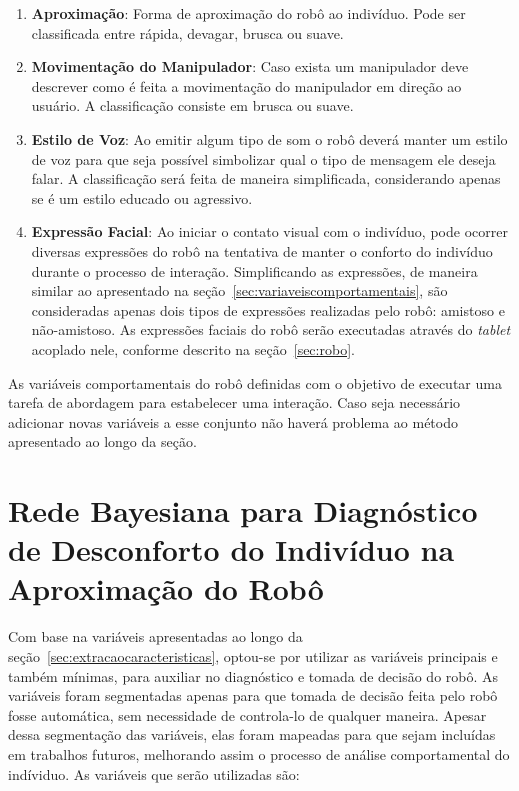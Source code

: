 \begin{enumerate}
	\item \textbf{Aproximação}: Forma de aproximação do robô ao indivíduo. Pode ser classificada entre rápida, devagar, brusca ou suave.
	\item \textbf{Movimentação do Manipulador}: Caso exista um manipulador deve descrever como é feita a movimentação do manipulador em direção ao usuário. A classificação consiste em brusca ou suave.
	\item \textbf{Estilo de Voz}: Ao emitir algum tipo de som o robô deverá manter um estilo de voz para que seja possível simbolizar qual o tipo de mensagem ele deseja falar. A classificação será feita de maneira simplificada, considerando apenas se é um estilo educado ou agressivo.
	\item \textbf{Expressão Facial}: Ao iniciar o contato visual com o indivíduo, pode ocorrer diversas expressões do robô na tentativa de manter o conforto do indivíduo durante o processo de interação. Simplificando as expressões, de maneira similar ao apresentado na seção~\ref{sec:variaveiscomportamentais}, são consideradas apenas dois tipos de expressões realizadas pelo robô: amistoso e não-amistoso. As expressões faciais do robô serão executadas através do \emph{tablet} acoplado nele, conforme descrito na seção~\ref{sec:robo}.
\end{enumerate}

As variáveis comportamentais do robô definidas com o objetivo de executar uma tarefa de abordagem para estabelecer uma interação. Caso seja necessário adicionar novas variáveis a esse conjunto não haverá problema ao método apresentado ao longo da seção.

\section{Rede Bayesiana para Diagnóstico de Desconforto do Indivíduo na Aproximação do Robô}
\label{sec:rede-bayesiana}

Com base na variáveis apresentadas ao longo da seção~\ref{sec:extracaocaracteristicas}, optou-se por utilizar as variáveis principais e também mínimas, para auxiliar no diagnóstico e tomada de decisão do robô. As variáveis foram segmentadas apenas para que tomada de decisão feita pelo robô fosse automática, sem necessidade de controla-lo de qualquer maneira. Apesar dessa segmentação das variáveis, elas foram mapeadas para que sejam incluídas em trabalhos futuros, melhorando assim o processo de análise comportamental do indíviduo. As variáveis que serão utilizadas são:


